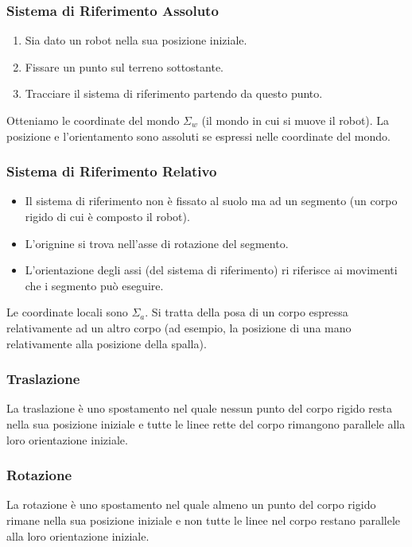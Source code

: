 \documentclass[a4paper,portrait,12pt]{article}
\theoremstyle{definition}
\begin{document}
\subsubsection{Sistema di Riferimento Assoluto}

\begin{enumerate}
\item Sia dato un robot nella sua posizione iniziale.
\item Fissare un punto sul terreno sottostante.
\item Tracciare il sistema di riferimento partendo da questo punto.
\end{enumerate}
Otteniamo le coordinate del mondo $\Sigma_w$ (il mondo in cui si muove il robot).
La posizione e l'orientamento sono assoluti se espressi nelle coordinate del mondo.

\subsubsection{Sistema di Riferimento Relativo}

\begin{itemize}
\item Il sistema di riferimento non è fissato al suolo ma ad un segmento (un corpo rigido di cui è composto il robot).
\item L'orignine si trova nell'asse di rotazione del segmento.
\item L'orientazione degli assi (del sistema di riferimento) ri riferisce ai movimenti che i segmento può eseguire.
\end{itemize}
Le coordinate locali sono $\Sigma_a$.
Si tratta della posa di un corpo espressa relativamente ad un altro corpo (ad esempio, la posizione di una mano relativamente alla posizione della spalla).

\subsubsection{Traslazione}

La traslazione è uno spostamento nel quale nessun punto del corpo rigido resta nella sua posizione iniziale e tutte le linee rette del corpo rimangono parallele alla loro orientazione iniziale. 

\subsubsection{Rotazione}

La rotazione è uno spostamento nel quale almeno un punto del corpo rigido rimane nella sua posizione iniziale e non tutte le linee nel corpo restano parallele alla loro orientazione iniziale.\\
\end{document}
